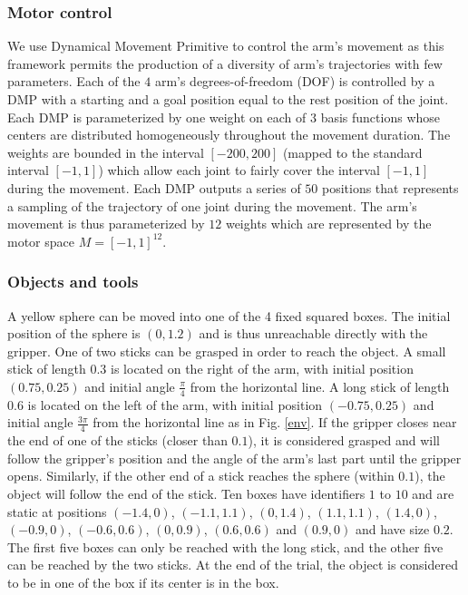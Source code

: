 \documentclass[10pt,letterpaper]{article}
\begin{document}
		
		\subsubsection{Motor control}
		
			We use Dynamical Movement Primitive \cite{ijspeert_dynamical_2013} to control the arm's movement as this framework permits the production of a diversity of arm's trajectories with few parameters.
			Each of the $4$ arm's degrees-of-freedom (DOF) is controlled by a DMP with a starting and a goal position equal to the rest position of the joint.
			Each DMP is parameterized by one weight on each of $3$ basis functions whose centers are distributed homogeneously throughout the movement duration.
			The weights are bounded in the interval $[-200,200]$ (mapped to the standard interval $[-1,1]$) which allow each joint to fairly cover the interval $[-1,1]$ during the movement.
			Each DMP outputs a series of $50$ positions that represents a sampling of the trajectory of one joint during the movement.		
			The arm's movement is thus parameterized by $12$ weights which are represented by the motor space $M=[-1,1]^{12}$.\\
		
			
		\subsubsection{Objects and tools}
			
			A yellow sphere can be moved into one of the 4 fixed squared boxes. 
			The initial position of the sphere is $(0, 1.2)$ and is thus unreachable directly with the gripper.
			One of two sticks can be grasped in order to reach the object.
			A small stick of length $0.3$ is located on the right of the arm, with initial position $(0.75, 0.25)$ and initial angle $\frac{\pi}{4}$ from the horizontal line.
			A long stick of length $0.6$ is located on the left of the arm, with initial position $(-0.75, 0.25)$ and initial angle $\frac{3\pi}{4}$ from the horizontal line as in Fig. \ref{env}.			
			If the gripper closes near the end of one of the sticks (closer than $0.1$), it is considered grasped and will follow the gripper's position and the angle of the arm's last part until the gripper opens.			
			Similarly, if the other end of a stick reaches the sphere (within $0.1$), the object will follow the end of the stick.
			Ten boxes have identifiers $1$ to $10$ and are static at positions $(-1.4, 0)$, $(-1.1, 1.1)$, $(0, 1.4)$, $(1.1, 1.1)$, $(1.4, 0)$, $(-0.9, 0)$, $(-0.6, 0.6)$, $(0, 0.9)$, $(0.6, 0.6)$ and $(0.9, 0)$ and have size $0.2$.
			The first five boxes can only be reached with the long stick, and the other five can be reached by the two sticks.
			At the end of the trial, the object is considered to be in one of the box if its center is in the box.\\
		
\end{document}
